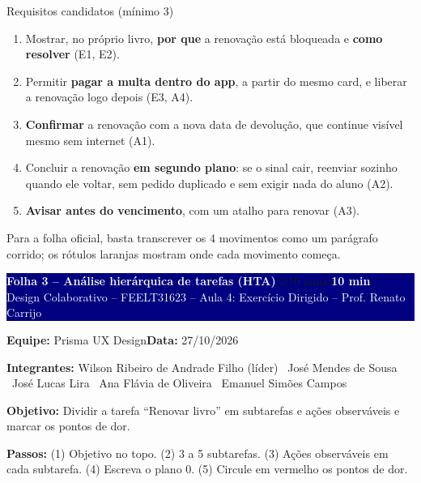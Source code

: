 \documentclass[10pt,a4paper]{article}
\newcommand{\equipenome}{Prisma UX Design}
\newcommand{\dataentrega}{27/10/2026}
\newcommand{\integrantes}{Wilson Ribeiro de Andrade Filho (líder) \textbullet\ José Mendes de Sousa \textbullet\ José Lucas Lira \textbullet\ Ana Flávia de Oliveira \textbullet\ Emanuel Simões Campos}
\newcommand{\folha}[2]{%
  \noindent
  \colorbox{navy}{\parbox{\dimexpr\linewidth-2\fboxsep\relax}{%
    \vspace{3pt}%
    \textcolor{white}{\bfseries\large #1}\hfill
    \ifx&#2&\else\colorbox{laranja}{\textcolor{white}{\bfseries\small #2}}\fi\\[1pt]
    \textcolor{white}{\scriptsize Design Colaborativo -- FEELT31623 -- Aula 4: Exercício Dirigido -- Prof. Renato Carrijo}%
    \vspace{3pt}}}%
  \par\vspace{5pt}
  {\small\textbf{Equipe:} \equipenome\hfill\textbf{Data:} \dataentrega\par}
  {\scriptsize\color{subtle}\textbf{Integrantes:} \integrantes\par}
  \vspace{4pt}}
\newcommand{\objetivo}[1]{%
  \begin{tcolorbox}[colback=laranjabg,colframe=laranja,boxrule=0.5pt,arc=0pt,
    left=3pt,right=3pt,top=1pt,bottom=1pt,fontupper=\small]
  \textbf{Objetivo:} #1
  \end{tcolorbox}\vspace{-4pt}}
\newcommand{\passos}[1]{{\footnotesize\textbf{Passos:} #1\par}\vspace{4pt}}
\begin{document}
\begin{caixa}{Requisitos candidatos (mínimo 3)}
\begin{enumerate}[label=\textbf{RC\arabic*.},leftmargin=2.6em,itemsep=4pt]
  \item Mostrar, no próprio livro, \textbf{por que} a renovação está bloqueada e \textbf{como resolver} (E1, E2).
  \item Permitir \textbf{pagar a multa dentro do app}, a partir do mesmo card, e liberar a renovação logo depois (E3, A4).
  \item \textbf{Confirmar} a renovação com a nova data de devolução, que continue visível mesmo sem internet (A1).
  \item Concluir a renovação \textbf{em segundo plano}: se o sinal cair, reenviar sozinho quando ele voltar, sem pedido duplicado e sem exigir nada do aluno (A2).
  \item \textbf{Avisar antes do vencimento}, com um atalho para renovar (A3).
\end{enumerate}
\end{caixa}

{\scriptsize\color{subtle}Para a folha oficial, basta transcrever os 4 movimentos como um parágrafo corrido; os rótulos laranjas mostram onde cada movimento começa.\par}

\newpage
\folha{Folha 3 -- Análise hierárquica de tarefas (HTA)}{10 min}
\objetivo{Dividir a tarefa ``Renovar livro'' em subtarefas e ações observáveis e marcar os pontos de dor.}
\passos{(1) Objetivo no topo. (2) 3 a 5 subtarefas. (3) Ações observáveis em cada subtarefa. (4) Escreva o plano 0. (5) Circule em vermelho os pontos de dor.}
\end{document}
